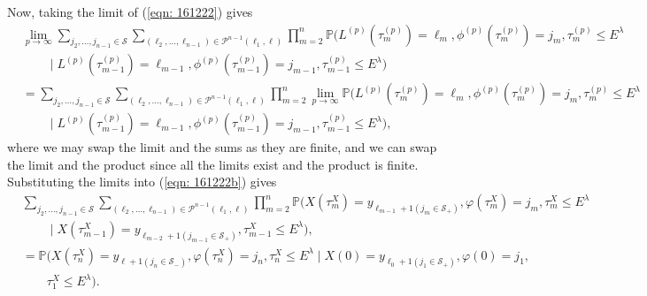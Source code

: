 Now, taking the limit of (\ref{eqn: 161222}) gives 
\begin{align}
	&\lim_{p\to\infty}\sum_{j_2,\dots,j_{n-1}\in\mathcal S}\sum_{(\ell_2,\dots,\ell_{n-1}) \in\mathcal P^{n-1}(\ell_1,\ell)}\prod_{m=2}^{n}\mathbb P(L^{(p)}(\tau_m^{(p)}) = \ell_m, \phi^{(p)}(\tau_m^{(p)}) = j_m, \tau_{m}^{(p)}\leq E^\lambda \nonumber
            	 \\&\qquad\mid L^{(p)}(\tau_{m-1}^{(p)}) = \ell_{m-1}, 
	 	 \phi^{(p)}(\tau_{m-1}^{(p)}) = j_{m-1}, \tau_{m-1}^{(p)}\leq E^\lambda) \nonumber 
	\\ &=\sum_{j_2,\dots,j_{n-1}\in\mathcal S}\sum_{(\ell_2,\dots,\ell_{n-1}) \in\mathcal P^{n-1}(\ell_1,\ell)}\prod_{m=2}^{n}\lim_{p\to\infty} \mathbb P(L^{(p)}(\tau_m^{(p)}) = \ell_m, \phi^{(p)}(\tau_m^{(p)}) = j_m, \tau_{m}^{(p)}\leq E^\lambda \nonumber
            	 \\&\qquad \mid L^{(p)}(\tau_{m-1}^{(p)}) = \ell_{m-1}, 
	 	 \phi^{(p)}(\tau_{m-1}^{(p)}) = j_{m-1}, \tau_{m-1}^{(p)}\leq E^\lambda),
	 \label{eqn: 161222b}
\end{align}
where we may swap the limit and the sums as they are finite, and we can swap the limit and the product since all the limits exist and the product is finite. Substituting the limits into (\ref{eqn: 161222b}) gives 
\begin{align}
	&\sum_{j_2,\dots,j_{n-1}\in\mathcal S}\sum_{(\ell_2,\dots,\ell_{n-1})  \in\mathcal P^{n-1}(\ell_1,\ell)} \prod_{m=2}^{n}\mathbb P(X(\tau_m^X) = y_{\ell_{m-1}+1(j_{m}\in\mathcal S_+)}, \varphi(\tau_m^X) = j_m, \tau_{m}^X\leq E^\lambda \nonumber
            	\\&\qquad \mid X(\tau_{m-1}^X)=y_{\ell_{m-2}+1(j_{m-1}\in\mathcal S_+)},\tau_{m-1}^X\leq E^\lambda),\nonumber
		\\&= \mathbb P(X(\tau_n^X) = y_{\ell+1(j_{n}\in\mathcal S_-)}, 
		\varphi(\tau_n^X) = j_n, \tau_{n}^X\leq E^\lambda \mid X(0)=y_{\ell_{0}+1(j_{1}\in\mathcal S_+)},
		\varphi(0)=j_{1},\nonumber 
		\\&\qquad{}\tau_1^X\leq E^\lambda).
\end{align}

